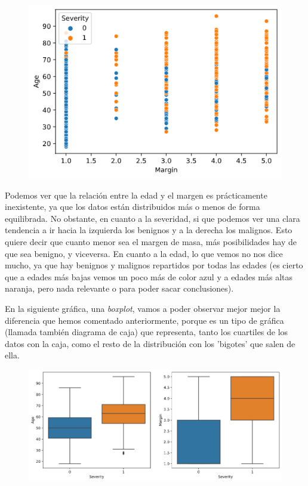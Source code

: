 \documentclass[11pt,a4paper]{article}
\begin{document}
\begin{figure}[H]
    \centering
    \includegraphics[scale=0.5]{img/scatter-age-margin.png}
\end{figure}

Podemos ver que la relación entre la edad y el margen es prácticamente inexistente, ya que los datos están distribuidos más o menos
de forma equilibrada. No obstante, en cuanto a la severidad, si que podemos ver una clara tendencia a ir hacia la izquierda los
benignos y a la derecha los malignos. Esto quiere decir que cuanto menor sea el margen de masa, más posibilidades hay de que sea
benigno, y viceversa. En cuanto a la edad, lo que vemos no nos dice mucho, ya que hay benignos y malignos repartidos por todas las
edades (es cierto que a edades más bajas vemos un poco más de color azul y a edades más altas naranja, pero nada relevante o para
poder sacar conclusiones).

En la siguiente gráfica, una \textit{boxplot}, vamos a poder observar mejor mejor la diferencia que hemos comentado anteriormente,
porque es un tipo de gráfica (llamada también diagrama de caja) que representa, tanto los cuartiles de los datos con la caja, como
el resto de la distribución con los 'bigotes' que salen de ella.

\begin{figure}[H]
    \centering
    \includegraphics[scale=0.4]{img/boxplot-age-margin.png}
\end{figure}
\end{document}
